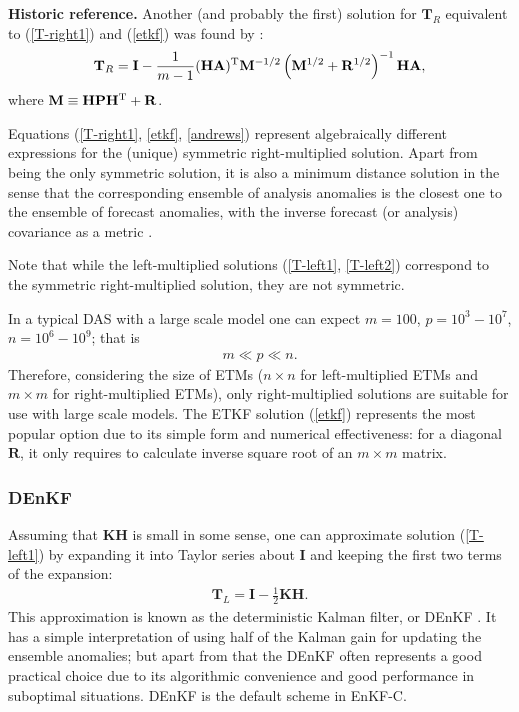 \documentclass[11pt]{report}
\newcommand{\mb} {\mathbf}
\newcommand{\T}{^{\tiny \mathrm T}}
\begin{document}
{
  \scriptsize
  {\bf Historic reference.} Another (and probably the first) solution for $\mb T_R$ equivalent to (\ref{T-right1}) and (\ref{etkf}) was found by \citet{and68a}:
  \setlength{\abovedisplayskip}{1pt}
  \setlength{\belowdisplayskip}{3pt}
  \begin{align}
    \label{andrews}
    \mb T_R = \mb I - \frac{1}{m-1} (\mb H \mb A)\T \mb M^{-1/2} \left(\mb M^{1/2} + \mb R^{1/2}\right)^{-1} \mb H \mb A,
  \end{align}
  where $\mb M \equiv \mb H \mb P \mb H\T + \mb R$.
}

Equations (\ref{T-right1}, \ref{etkf}, \ref{andrews}) represent algebraically different expressions for the (unique) symmetric right-multiplied solution.
Apart from being the only symmetric solution, it is also a minimum distance solution in the sense that the corresponding ensemble of analysis anomalies is the closest one to the ensemble of forecast anomalies, with the inverse forecast (or analysis) covariance as a metric \citep{ott03a}.

Note that while the left-multiplied solutions (\ref{T-left1}, \ref{T-left2}) correspond to the symmetric right-multiplied solution, they are not symmetric.

In a typical DAS with a large scale model one can expect $m = 100$, $p = 10^3-10^7$, $n = 10^6-10^9$; that is
\begin{align}
  m \ll p \ll n.
\end{align}
Therefore, considering the size of ETMs ($n \times n$ for left-multiplied ETMs and $m \times m$ for right-multiplied ETMs), only right-multiplied solutions are suitable for use with large scale models.
The ETKF solution (\ref{etkf}) represents the most popular option due to its simple form and numerical effectiveness: for a diagonal $\mb R$, it only requires to calculate inverse square root of an $m \times m$ matrix.

\subsubsection{DEnKF}

Assuming that $\mb K \mb H$ is small in some sense, one can approximate solution (\ref{T-left1}) by expanding it into Taylor series about $\mb I$ and keeping the first two terms of the expansion:
\begin{align}
  \label{denkf}
  \mb T_L = \mb I - \frac{1}{2} \mb K \mb H.
\end{align}
This approximation is known as the deterministic Kalman filter, or DEnKF \citep{sak08a}.
It has a simple interpretation of using half of the Kalman gain for updating the ensemble anomalies; but apart from that the DEnKF often represents a good practical choice due to its algorithmic convenience and good performance in suboptimal situations.
DEnKF is the default scheme in EnKF-C.
\end{document}
